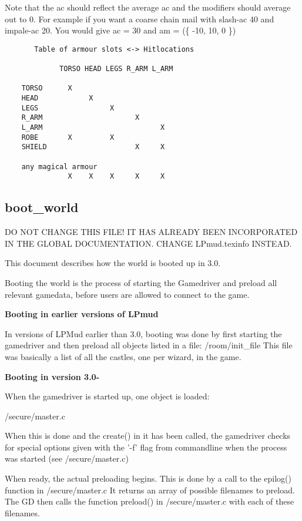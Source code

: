 \begin{itemize}
Note that the ac should reflect the average ac and the modifiers
should average out to 0. For example if you want a coarse chain mail with
slash-ac 40 and impale-ac 20. You would give ac = 30 and am = (\{ -10, 10, 0 \})

\begin{verbatim}
       Table of armour slots <-> Hitlocations

             TORSO HEAD LEGS R_ARM L_ARM

    TORSO      X      
    HEAD            X
    LEGS                 X
    R_ARM                      X
    L_ARM                            X
    ROBE       X         X                
    SHIELD                     X     X                          

    any magical armour
               X    X    X     X     X      
\end{verbatim}
\end{itemize}

\subsection{boot\_world}

DO NOT CHANGE THIS FILE! IT HAS ALREADY BEEN INCORPORATED IN THE GLOBAL
DOCUMENTATION. CHANGE LPmud.texinfo INSTEAD.

This document describes how the world is booted up in 3.0.

Booting the world is the process of starting the Gamedriver and preload all
relevant gamedata, before users are allowed to connect to the game.

{\bf Booting in earlier versions of LPmud}


In versions of LPMud earlier than 3.0, booting was done by first starting the
gamedriver and then preload all objects listed in a file: /room/init\_file
This file was basically a list of all the castles, one per wizard, in the game.

{\bf Booting in version 3.0-}


When the gamedriver is started up, one object is loaded:

    /secure/master.c

When this is done and the create() in it has been called, the gamedriver
checks for special options given with the '-f' flag from commandline when 
the process was started (see /secure/master.c)

When ready, the actual preloading begins. This is done by a call to the
epilog() function in /secure/master.c It returns an array of possible 
filenames to preload. The GD then calls the function preload() in 
/secure/master.c with each of these filenames. 


